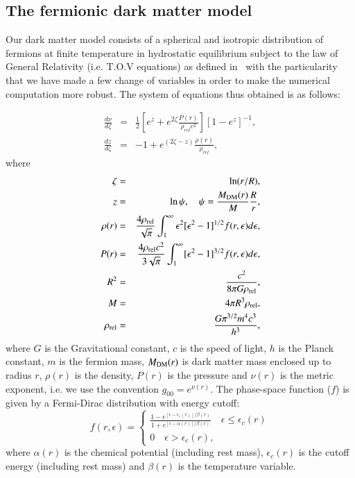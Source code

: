 \documentclass[twocolumn]{aa}
\begin{document}
\subsection{The fermionic dark matter model}
Our dark matter model consists of a spherical and isotropic distribution of fermions at finite temperature in hydrostatic equilibrium subject to the law of General Relativity (i.e. T.O.V equations) as defined in~\cite{arguelles_novel_2018} with the particularity that we have made a few change of variables in order to make the numerical computation more robust. The system of equations thus obtained is as follows:

\begin{eqnarray}
   \label{sode}
   \frac{d\nu}{d\zeta} & = & \frac{1}{2}\left[e^{z}+e^{2\zeta}\frac{P(r)}{\rho_{rel}c^2}\right][1-e^{z}]^{-1},\\
   \frac{dz}{d\zeta} & = &-1+e^{(2\zeta-z)}\frac{\rho(r)}{\rho_{rel}},
\end{eqnarray}
where
\begin{eqnarray}
   \zeta &=& \ln(r/R),\\
   z &=&\ln\psi,\quad \psi = \frac{M_{\rm{DM}}(r)}{M}\frac{R}{r},\label{mass_dm}\\
   \rho(r)&=&\frac{4\rho_{\rm rel}}{\sqrt{\pi}}\int^\infty_1\epsilon^2[\epsilon^2-1]^{1/2}f(r,\epsilon)d\epsilon,\\
   P(r)&=&\frac{4\rho_{\rm rel}c^2}{3\sqrt{\pi}}\int^\infty_1[\epsilon^2-1]^{3/2}f(r,\epsilon)d\epsilon,\\
   R^2 &=& \frac{c^2}{8\pi G \rho_{\rm{rel}}},\\
   M &=& 4\pi R^3 \rho_{\rm{rel}},\\
   \rho_{\rm{rel}}&=& \frac{ G\pi^{3/2} m^4 c^3}{h^3},
\end{eqnarray}
where $G$ is the Gravitational constant, $c$ is the speed of light, $h$ is the Planck constant, $m$ is the fermion mass, $M_{\rm{DM}}(r)$ is dark matter mass enclosed up to radius $r$, $\rho(r)$ is the density, $P(r)$ is the pressure and $\nu(r)$ is the metric exponent, i.e. we use the convention $g_{00}=e^{\nu(r)}$. The phase-space function ($f$) is given by a Fermi-Dirac distribution with energy cutoff:
\begin{equation}
f(r,\epsilon)=
   \begin{cases}
      \frac{\displaystyle{1-e^{[\epsilon-\epsilon_c(r)]/\beta(r)}}}
      {\displaystyle{1+e^{[\epsilon-\alpha(r)]/\beta(r)}}}\quad \epsilon \leq \epsilon_c(r)\\
      0\quad \epsilon > \epsilon_c(r),
   \end{cases}
\end{equation}
where $\alpha(r)$ is the chemical potential (including rest mass), $\epsilon_c(r)$ is the cutoff
energy (including rest mass) and $\beta(r)$ is the temperature variable.
\end{document}

